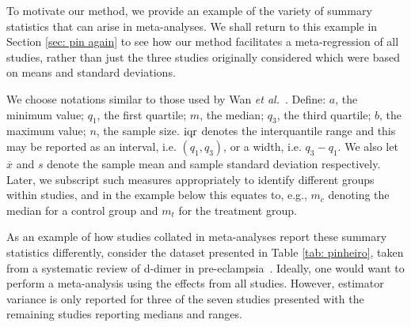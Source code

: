\documentclass{article}
\begin{document}
To motivate our method, we provide an example of the variety of summary statistics that can arise in meta-analyses. We shall return to this example in Section \ref{sec: pin again} to see how our method facilitates a meta-regression of all studies, rather than just the three studies originally considered which were based on means and standard deviations.

We choose notations similar to those used by Wan \emph{et al.}~\cite{wanEstimatingSampleMean2014}.  Define:
$a$, the minimum value;
$q_1$, the first quartile;
$m$, the median;
$q_3$, the third quartile;
$b$, the maximum value;
$n$, the sample size.  $\operatorname{iqr}$ denotes the interquantile range and this may be reported as an interval, i.e. $(q_1,q_3)$, or a width, i.e. $q_3-q_1$. We also let $\overline{x}$ and $s$ denote the sample mean and sample standard deviation respectively.  Later, we subscript such measures appropriately to identify different groups within studies, and in the example below this equates to, e.g., $m_c$ denoting the median for a control group and $m_t$ for the treatment group.

As an example of how studies collated in meta-analyses report these summary statistics differently, consider the dataset presented in Table \ref{tab: pinheiro}, taken from a systematic review of d-dimer in pre-eclampsia~\cite{pinheiroDdimerPreeclampsiaSystematic2012}. Ideally, one would want to perform a meta-analysis using the effects from all studies. However, estimator variance is only reported for three of the seven studies presented with the remaining studies reporting medians and ranges.
\end{document}
